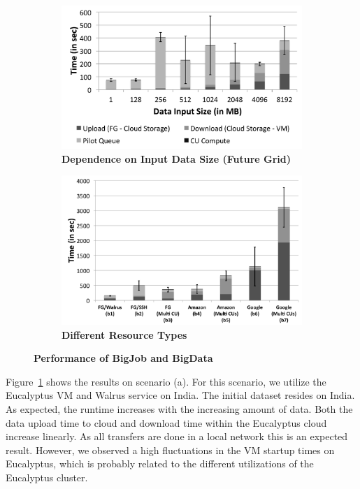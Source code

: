 \documentclass[times]{cpeauth}
\begin{document}
\begin{figure}[t]
    \begin{subfigure}[b]{0.5\textwidth}
	\centering
		\includegraphics[width=\textwidth]{performance/pd_fg_input_size.pdf}
	\caption{\textbf{Dependence on Input Data Size (Future Grid)}}
	\label{fig:performance_size}
   \end{subfigure}
   \begin{subfigure}[b]{0.5\textwidth}
	\centering
	\includegraphics[width=\textwidth]{performance/pd_google_aws.pdf}
	\caption{\textbf{Different Resource Types}}
    \label{fig:performance_pd_google_aws}
	\end{subfigure}
	\caption{\textbf{Performance of BigJob and BigData}}
\end{figure}


Figure~\ref{fig:performance_size} shows the results on scenario (a). For this
scenario, we utilize the Eucalyptus VM and Walrus service on India. The 
initial dataset resides on India. As expected, the runtime increases with the 
increasing amount of data. Both the data upload time to cloud and download 
time within the Eucalyptus cloud increase linearly. As all transfers are done 
in a local network this is an expected result. However, we observed a high 
fluctuations in the VM startup times on Eucalyptus, which is probably related 
to the different utilizations of the Eucalyptus cluster.
\end{document}
